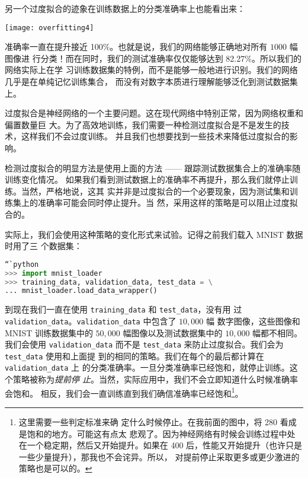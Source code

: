 另一个过度拟合的迹象在训练数据上的分类准确率上也能看出来：
\begin{center}
  \texttt{[image: overfitting4]}
\end{center}

准确率一直在提升接近 100\%。也就是说，我们的网络能够正确地对所有 $1000$ 幅图像进
行分类！而在同时，我们的测试准确率仅仅能够达到 82.27\%。所以我们的网络实际上在学
习训练数据集的特例，而不是能够一般地进行识别。我们的网络几乎是在单纯记忆训练集合，
而没有对数字本质进行理解能够泛化到测试数据集上。

过度拟合是神经网络的一个主要问题。这在现代网络中特别正常，因为网络权重和偏置数量巨
大。为了高效地训练，我们需要一种检测过度拟合是不是发生的技术，这样我们不会过度训练。
并且我们也想要找到一些技术来降低过度拟合的影响。

检测过度拟合的明显方法是使用上面的方法 —— 跟踪测试数据集合上的准确率随训练变化情况。
如果我们看到测试数据上的准确率不再提升，那么我们就停止训练。当然，严格地说，这其
实并非是过度拟合的一个必要现象，因为测试集和训练集上的准确率可能会同时停止提升。当
然，采用这样的策略是可以阻止过度拟合的。

实际上，我们会使用这种策略的变化形式来试验。记得之前我们载入 MNIST 数据时用了三
个数据集：

\begin{lstlisting}[language=Python]
“`python
>>> import mnist_loader
>>> training_data, validation_data, test_data = \
... mnist_loader.load_data_wrapper()
\end{lstlisting}

到现在我们一直在使用 \lstinline!training_data! 和 \lstinline!test_data!，没有用
过 \lstinline!validation_data!。\lstinline!validation_data! 中包含了 $10,000$ 幅
数字图像，这些图像和 MNIST 训练数据集中的 $50,000$ 幅图像以及测试数据集中的
$10,000$ 幅都不相同。我们会使用 \lstinline!validation_data! 而不是
\lstinline!test_data! 来防止过度拟合。我们会为 \lstinline!test_data! 使用和上面提
到的相同的策略。我们在每个\epoch{}的最后都计算在 \lstinline!validation_data! 上
的分类准确率。一旦分类准确率已经饱和，就停止训练。这个策略被称为\emph{提前停
  止}。当然，实际应用中，我们不会立即知道什么时候准确率会饱和。
相反，我们会一直训练直到我们确信准确率已经饱和\footnote{这里需要一些判定标准来确
  定什么时候停止。在我前面的图中，将 280 \epoch{}看成是饱和的地方。可能这有点太
  悲观了。因为神经网络有时候会训练过程中处在一个稳定期，然后又开始提升。如果在
  400 \epoch{}后，性能又开始提升（也许只是一些少量提升），那我也不会诧异。所以，
  对提前停止采取更多或更少激进的策略也是可以的。}。

